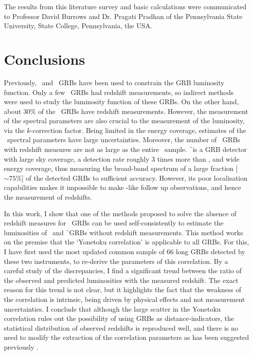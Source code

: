 \begin{checkit}
The results from this literature survey and basic calculations were communicated to Professor David Burrows and Dr. Pragati Pradhan of the Pennsylvania State University, State College, Pennsylvania, the USA.
\end{checkit}












\section{Conclusions}
\label{sec:conclusions--LGRBs}
Previously, \B\ and \s\ GRBs have been used to constrain the GRB luminosity function. Only a few \B\ GRBs had redshift measurements, so indirect methods were used to study the luminosity function of these GRBs. On the other hand, about $30 \%$ of the \s\ GRBs have redshift measurements. However, the measurement of the spectral parameters are also crucial to the measurement of the luminosity, via the $k$-correction factor. Being limited in the energy coverage, estimates of the \s\ spectral parameters have large uncertainties. Moreover, the number of \s\ GRBs with redshift measures are not as large as the entire \B\ sample. \f\ is a GRB detector with large sky coverage, a detection rate roughly $3$ times more than \s, and wide energy coverage, thus measuring the broad-band spectrum of a large fraction [$\sim 75 \%$] of the detected GRBs to sufficient accuracy. However, its poor localisation capabilities makes it impossible to make \s-like follow up observations, and hence the measurement of redshifts.

In this work, I show that one of the methods proposed to solve the absence of redshift measures for \B\ GRBs can be used self-consistently to estimate the luminosities of \s\ and \f\ GRBs without redshift measurements. This method works on the premise that the `Yonetoku correlation' is applicable to all GRBs. For this, I have first used the most updated common sample of $66$ long GRBs detected by these two instruments, to re-derive the parameters of this correlation. By a careful study of the discrepancies, I find a significant trend between the ratio of the observed and predicted luminosities with the measured redshift. The exact reason for this trend is not clear, but it highlights the fact that the weakness of the correlation is intrinsic, being driven by physical effects and not measurement uncertainties. I conclude that although the large scatter in the Yonetoku correlation rules out the possibility of using GRBs as distance-indicators, the statistical distribution of observed redshifts is reproduced well, and there is no need to modify the extraction of the correlation parameters as has been suggested previously .

